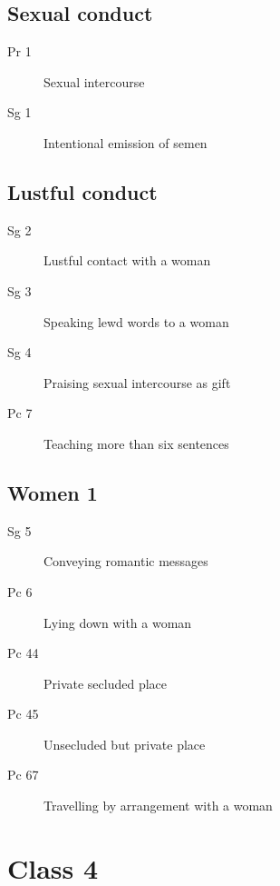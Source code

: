 \documentclass[11pt,oneside]{memoir}
\begin{document}
\begin{multicols}{2}

\section{Sexual conduct}

\begin{description}
\item[Pr 1 \orig] Sexual intercourse%
\item[Sg 1 \orig] Intentional emission of semen%
\end{description}

\section{Lustful conduct}

\begin{description}
\item[Sg 2 \orig] Lustful contact with a woman%
\item[Sg 3 \orig] Speaking lewd words to a woman%
\item[Sg 4 \orig] Praising sexual intercourse as gift%
\item[Pc 7] Teaching more than six sentences
\end{description}

\columnbreak

\section{Women 1}

\begin{description}
\item[Sg 5] Conveying romantic messages
\item[Pc 6 \orig] Lying down with a woman%
\item[Pc 44] Private secluded place
\item[Pc 45] Unsecluded but private place
\item[Pc 67 \orig] Travelling by arrangement with a woman%
\end{description}

\end{multicols}

\clearpage

\chapter{Class 4}
\end{document}
